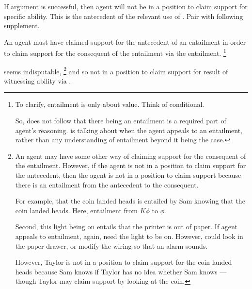 \begin{note}
  If argument is successful, then agent will not be in a position to claim support for specific ability.
  This is the antecedent of the relevant use of \aben{}.
  Pair \nI{} with following supplement.

  \begin{proposition}[\nIm{}]
    An agent must have claimed support for the antecedent of an entailment in order to claim support for the consequent of the entailment via the entailment.\nolinebreak
    \footnote{To clarify, entailment is only about value.
      Think of conditional.

      So, does not follow that there being an entailment is a required part of agent's reasoning.
      \nIm{} is talking about when the agent appeals to an entailment, rather than any understanding of entailment beyond it being the case.
    }
  \end{proposition}
  \nIm{} seems indisputable,\nolinebreak
  \footnote{
    An agent may have some other way of claiming support for the consequent of the entailment.
    However, if the agent is not in a position to claim support for the antecedent, then the agent is not in a position to claim support because there is an entailment from the antecedent to the consequent.\nolinebreak

    For example, that the coin landed heads is entailed by Sam knowing that the coin landed heads.
    Here, entailment from \(K\phi\) to \(\phi\).

    Second, this light being on entails that the printer is out of paper.
    If agent appeals to entailment, again, need the light to be on.
    However, could look in the paper drawer, or modify the wiring so that an alarm sounds.

    However, Taylor is not in a position to claim support for the coin landed heads because Sam knows if Taylor has no idea whether Sam knows --- though Taylor may claim support by looking at the coin.
  }
  and so not in a position to claim support for result of witnessing ability via \AR{}.
\end{note}

